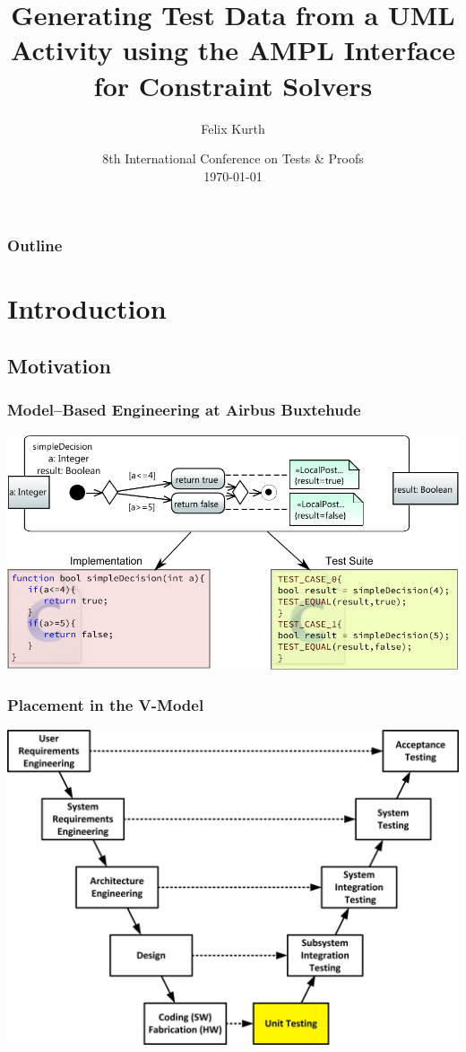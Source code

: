 \documentclass{beamer}
\title[Automated Generation of Test Data using AMPL]{Generating Test Data from a UML Activity using the AMPL Interface for Constraint Solvers}
\author[F. Kurth]{Felix Kurth}
\institute[sts.tuhh.de]
{
Institute for Software Systems\\
Hamburg University of Technology
}
\date[TAP2014]{8th International Conference on Tests \& Proofs\\
\today
}
\begin{document}
\begin{frame}
\titlepage
\end{frame}

\begin{frame}
\frametitle{Outline} 
\tableofcontents  
\end{frame}


\section{Introduction}
\subsection{Motivation}
\begin{frame}
\frametitle{Model--Based Engineering at Airbus Buxtehude}
\includegraphics[width=\textwidth]{../Thesis/pics/BasicExamplesSimpleDecision.pdf}
\end{frame}
\begin{frame}
\frametitle{Placement in the V-Model}
\includegraphics[width=\textwidth,height=0.8\textheight]{./pics/V-model.jpg}
\end{frame}
\end{document}
